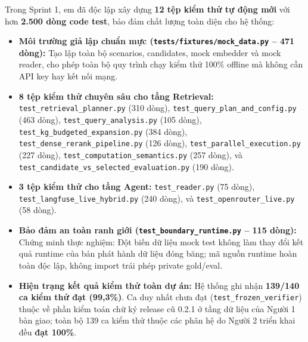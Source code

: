 \documentclass[a4paper,11pt]{article}
\begin{document}
Trong Sprint 1, em đã độc lập xây dựng \textbf{12 tệp kiểm thử tự động mới} với hơn \textbf{2.500 dòng code test}, bảo đảm chất lượng toàn diện cho hệ thống:
\begin{itemize}[leftmargin=1.5em]
    \item \textbf{Môi trường giả lập chuẩn mực (\nolinkurl{tests/fixtures/mock_data.py} -- 471 dòng):} Tạo lập toàn bộ scenarios, candidates, mock embedder và mock reader, cho phép toàn bộ quy trình chạy kiểm thử 100\% offline mà không cần API key hay kết nối mạng.
    \item \textbf{8 tệp kiểm thử chuyên sâu cho tầng Retrieval:}
    \nolinkurl{test_retrieval_planner.py} (310 dòng), \nolinkurl{test_query_plan_and_config.py} (463 dòng), \nolinkurl{test_query_analysis.py} (105 dòng), \nolinkurl{test_kg_budgeted_expansion.py} (384 dòng), \nolinkurl{test_dense_rerank_pipeline.py} (126 dòng), \nolinkurl{test_parallel_execution.py} (227 dòng), \nolinkurl{test_computation_semantics.py} (257 dòng), và \nolinkurl{test_candidate_vs_selected_evaluation.py} (190 dòng).
    \item \textbf{3 tệp kiểm thử cho tầng Agent:} \nolinkurl{test_reader.py} (75 dòng), \nolinkurl{test_langfuse_live_hybrid.py} (240 dòng), và \nolinkurl{test_openrouter_live.py} (58 dòng).
    \item \textbf{Bảo đảm an toàn ranh giới (\nolinkurl{test_boundary_runtime.py} -- 115 dòng):} Chứng minh thực nghiệm: Đột biến dữ liệu mock test không làm thay đổi kết quả runtime của bản phát hành dữ liệu đóng băng; mã nguồn runtime hoàn toàn độc lập, không import trái phép private gold/eval.
    \item \textbf{Hiện trạng kết quả kiểm thử toàn dự án:} Hệ thống ghi nhận \textbf{139/140 ca kiểm thử đạt (99,3\%)}. Ca duy nhất chưa đạt (\texttt{test\_frozen\_verifier}) thuộc về phần kiểm toán chữ ký release cũ 0.2.1 ở tầng dữ liệu của Người 1 bàn giao; toàn bộ 139 ca kiểm thử thuộc các phân hệ do Người 2 triển khai đều \textbf{đạt 100\%}.
\end{itemize}
\end{document}
